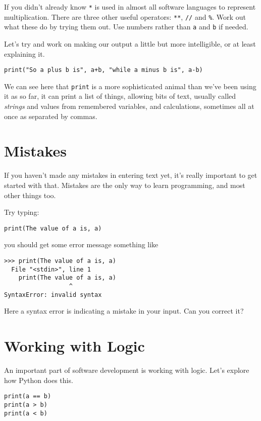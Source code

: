 \documentclass[12pt,oneside]{cttutorial}
\begin{document}
If you didn't already know \lstinline!*! is used in almost all software languages to represent multiplication. 
There are three other useful operators: \lstinline!**!, \lstinline!//! and \lstinline!%!. Work out what these do by trying them out.
Use numbers rather than \lstinline!a! and \lstinline!b! if needed.

Let's try and work on making our output a little but more intelligible, or at least explaining it.

\begin{lstlisting}
print("So a plus b is", a+b, "while a minus b is", a-b)
\end{lstlisting}

We can see here that \lstinline!print! is a more sophisticated animal than we've been using it as so far, it can print a list of things, allowing
bits of text, usually called \emph{strings} and values from remembered variables, and calculations, sometimes all at once as separated by commas.

\section{Mistakes}

If you haven't made any mistakes in entering text yet, it's really important to get started with that. Mistakes are the only way to
learn programming, and most other things too.

Try typing:

\begin{lstlisting}
print(The value of a is, a)
\end{lstlisting}

you should get some error message something like

\begin{verbatim}
>>> print(The value of a is, a)
  File "<stdin>", line 1
    print(The value of a is, a)
                  ^
SyntaxError: invalid syntax
\end{verbatim}

Here a syntax error is indicating a mistake in your input. Can you correct it?

\section{Working with Logic}

An important part of software development is working with logic. Let's explore how Python does this.

\begin{lstlisting}
print(a == b)
print(a > b)
print(a < b)
\end{lstlisting}
\end{document}
